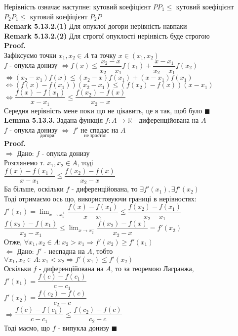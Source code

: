 \documentclass[a4paper, 14pt]{extarticle}
\def\huge{\displaystyle}
\def\bigline{\vspace{5mm}\\}
\def\rm#1{\textbf{Remark {#1}}}
\def\lm#1{\textbf{Lemma {#1}}}
\def\proof{\textbf{Proof.}\\}
\def\bigline{\vspace{5mm}\\}
\def\qed{$\blacksquare$}
\begin{document}
Нерівність означає наступне: кутовий коефіцієнт $PP_1 \leq$ кутовий коефіцієнт $P_2P_1 \leq$ кутовий коефіцієнт $P_2P$
\bigline
\rm{5.13.2.(1)} Для опуклої догори нерівність навпаки\\
\rm{5.13.2.(2)} Для строгої опуклості нерінвість буде строгою
\bigline
\proof
Зафіксуємо точки $x_1,x_2 \in A$ та точку $x \in (x_1,x_2)$\\
$f$ - опукла донизу $\iff f(x) \leq \dfrac{x_2-x}{x_2-x_1}f(x_1) + \dfrac{x-x_1}{x_2-x_1}f(x_2)$\\
$\iff (x_2-x_1) f(x) \leq (x_2-x)f(x_1) + (x-x_1)f(x_1)$\\
$\iff (f(x)-f(x_1))(x_2-x_1) \leq (f(x_2)-f(x))(x-x_1)$\\
$\iff \dfrac{f(x)-f(x_1)}{x-x_1} \leq \dfrac{f(x_2)-f(x)}{x_2-x}$ \\
Середня нерівність мене поки що не цікавить, це я так, щоб було \qed
\bigline
\lm{5.13.3.} Задана функція $f: A \to \mathbb{R}$ - диференційована на $A$\\
$f$ - опукла $\underset{\textrm{догори}}{\textrm{донизу}}$ $\iff$ $f'$ $\underset{\textrm{не зростає}}{\textrm{не спадає}}$ на $A$\\
\proof
$\boxed{\Rightarrow}$ Дано: $f$ - опукла донизу\\
Розглянемо т. $x_1, x_2 \in A$, тоді\\
$\dfrac{f(x)-f(x_1)}{x-x_1} \leq \dfrac{f(x_2)-f(x)}{x_2-x}$\\
Ба більше, оскільки $f$ - диференційована, то $\exists f'(x_1), \exists f'(x_2)$\\
Тоді отримаємо ось що, використовуючи границі в нерівностях:\\
$f'(x_1) = \huge \lim_{x \to x_1^+} \dfrac{f(x)-f(x_1)}{x-x_1} \leq \dfrac{f(x_2)-f(x_1)}{x_2-x_1}$\\
$\dfrac{f(x_2)-f(x_1)}{x_2-x_1} \leq \huge \lim_{x \to x_2^-} \dfrac{f(x_2)-f(x)}{x_2-x} = f'(x_2)$\\
Отже, $\forall x_1,x_2 \in A: x_2 > x_1 \Rightarrow f'(x_2) \geq f'(x_1)$
\bigline
$\boxed{\Leftarrow}$ Дано: $f'$ - неспадна на $A$, тобто\\
$\forall x_1,x_2 \in A: x_1 < x_2 \Rightarrow f'(x_1) \leq f'(x_2)$\\
Оскільки $f$ - диференційована на $A$, то за теоремою Лагранжа,\\
$f'(x_1) = \dfrac{f(c) - f(c_1)}{c- c_1}$\\
$f'(x_2) = \dfrac{f(c_2) - f(c)}{c_2 - c}$\\
$\Rightarrow \dfrac{f(c) - f(c_1)}{c- c_1} \leq \dfrac{f(c_2) - f(c)}{c_2 - c}$\\
Тоді маємо, що $f$ - випукла донизу \qed
\bigline
\end{document}
